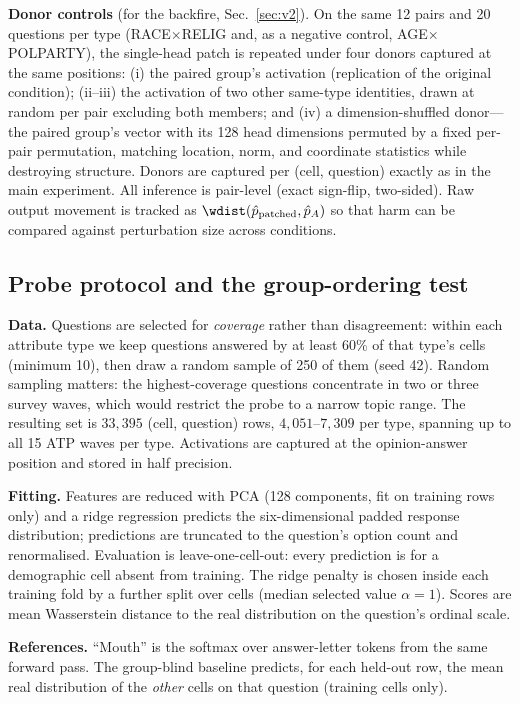 \textbf{Donor controls} (for the \starhead{} backfire,
Sec.~\ref{sec:v2}). On the same 12 pairs and 20 questions per type
(RACE$\times$RELIG and, as a negative control, AGE$\times$POLPARTY), the
single-head patch is repeated under four donors captured at the same
positions: (i) the paired group's activation (replication of the original
condition); (ii--iii) the activation of two other same-type identities,
drawn at random per pair excluding both members; and (iv) a
dimension-shuffled donor---the paired group's vector with its 128 head
dimensions permuted by a fixed per-pair permutation, matching location,
norm, and coordinate statistics while destroying structure. Donors are
captured per (cell, question) exactly as in the main experiment. All
inference is pair-level (exact sign-flip, two-sided). Raw output movement
is tracked as $\wdist(\hat{p}_{\text{patched}}, \hat{p}_A)$ so that
harm can be compared against perturbation size across conditions.

\subsection{Probe protocol and the group-ordering test}
\label{app:probe}
\textbf{Data.} Questions are selected for \emph{coverage} rather than
disagreement: within each attribute type we keep questions answered by at
least $60\%$ of that type's cells (minimum 10), then draw a random sample
of 250 of them (seed 42). Random sampling matters: the highest-coverage
questions concentrate in two or three survey waves, which would restrict
the probe to a narrow topic range. The resulting set is $33{,}395$
(cell, question) rows, $4{,}051$--$7{,}309$ per type, spanning up to all
15 ATP waves per type. Activations are captured at the opinion-answer
position and stored in half precision.

\textbf{Fitting.} Features are reduced with PCA (128 components, fit on
training rows only) and a ridge regression predicts the six-dimensional
padded response distribution; predictions are truncated to the question's
option count and renormalised. Evaluation is leave-one-cell-out: every
prediction is for a demographic cell absent from training. The ridge
penalty is chosen inside each training fold by a further split over cells
(median selected value $\alpha=1$). Scores are mean Wasserstein distance
to the real distribution on the question's ordinal scale.

\textbf{References.} ``Mouth'' is the softmax over answer-letter tokens
from the same forward pass. The group-blind baseline predicts, for each
held-out row, the mean real distribution of the \emph{other} cells on that
question (training cells only).

